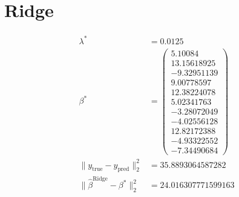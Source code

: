 \documentclass[11pt, a4paper, oneside]{memoir}
\begin{document}
\section{Ridge}
\begin{align*}
    \lambda^*                                    & = 0.0125             \\
    \beta^*                                      & = \begin{pmatrix}
                                                         5.10084     \\
                                                         13.15618925 \\
                                                         -9.32951139 \\
                                                         9.00778597  \\
                                                         12.38224078 \\
                                                         5.02341763  \\
                                                         -3.28072049 \\
                                                         -4.02556128 \\
                                                         12.82172388 \\
                                                         -4.93322552 \\
                                                         -7.34490684
                                                     \end{pmatrix}     \\
    \|y_{\text{true}} - y_{\text{pred}}\|_2^2    & = 35.8893064587282   \\
    \|\hat{\beta}^{\text{Ridge}} - \beta^*\|_2^2 & = 24.016307771599163
\end{align*}
\label{LastPage}
\end{document}
